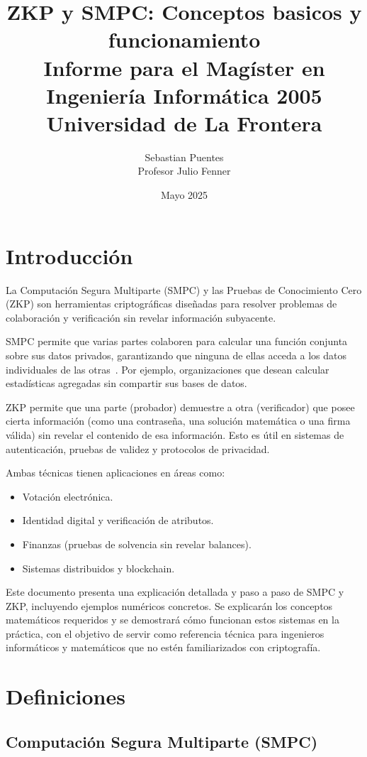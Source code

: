 \documentclass{article}
\title{ZKP y SMPC: Conceptos basicos y funcionamiento \\
Informe para el Magíster en Ingeniería Informática 2005 \\
Universidad de La Frontera}
\author{Sebastian Puentes \\
Profesor Julio Fenner}
\date{Mayo 2025}
\begin{document}
\sloppy
\maketitle

\section{Introducción}

La Computación Segura Multiparte (SMPC) y las Pruebas de Conocimiento Cero (ZKP) son herramientas criptográficas diseñadas para resolver problemas de colaboración y verificación sin revelar información subyacente.

SMPC permite que varias partes colaboren para calcular una función conjunta sobre sus datos privados, garantizando que ninguna de ellas acceda a los datos individuales de las otras~\cite{evans2018}. Por ejemplo, organizaciones que desean calcular estadísticas agregadas sin compartir sus bases de datos.

ZKP permite que una parte (probador) demuestre a otra (verificador) que posee cierta información (como una contraseña, una solución matemática o una firma válida) sin revelar el contenido de esa información. Esto es útil en sistemas de autenticación, pruebas de validez y protocolos de privacidad.

Ambas técnicas tienen aplicaciones en áreas como:
\begin{itemize}
    \item Votación electrónica.
    \item Identidad digital y verificación de atributos.
    \item Finanzas (pruebas de solvencia sin revelar balances).
    \item Sistemas distribuidos y blockchain.
\end{itemize}

Este documento presenta una explicación detallada y paso a paso de SMPC y ZKP, incluyendo ejemplos numéricos concretos. Se explicarán los conceptos matemáticos requeridos y se demostrará cómo funcionan estos sistemas en la práctica, con el objetivo de servir como referencia técnica para ingenieros informáticos y matemáticos que no estén familiarizados con criptografía.

\section{Definiciones}

\subsection{Computación Segura Multiparte (SMPC)}
\end{document}
